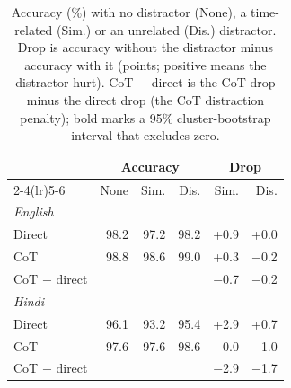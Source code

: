 \begin{table}[t]
\centering
\small
\setlength{\tabcolsep}{4pt}
\begin{tabular}{lrrrrr}
\toprule
 & \multicolumn{3}{c}{Accuracy} & \multicolumn{2}{c}{Drop} \\
\cmidrule(lr){2-4}\cmidrule(lr){5-6}
 & None & Sim. & Dis. & Sim. & Dis. \\
\midrule
\multicolumn{6}{l}{\textit{English}} \\
\quad Direct & 98.2 & 97.2 & 98.2 & +0.9 & +0.0 \\
\quad CoT & 98.8 & 98.6 & 99.0 & +0.3 & $-$0.2 \\
\quad CoT $-$ direct &  &  &  & $-$0.7 & $-$0.2 \\
\midrule
\multicolumn{6}{l}{\textit{Hindi}} \\
\quad Direct & 96.1 & 93.2 & 95.4 & +2.9 & +0.7 \\
\quad CoT & 97.6 & 97.6 & 98.6 & $-$0.0 & $-$1.0 \\
\quad CoT $-$ direct &  &  &  & $-$2.9 & $-$1.7 \\
\bottomrule
\end{tabular}
\caption{Accuracy (\%) with no distractor (None), a time-related (Sim.) or an unrelated (Dis.) distractor. Drop is accuracy without the distractor minus accuracy with it (points; positive means the distractor hurt). CoT $-$ direct is the CoT drop minus the direct drop (the CoT distraction penalty); bold marks a 95\% cluster-bootstrap interval that excludes zero.}
\label{tab:distractor}
\end{table}
